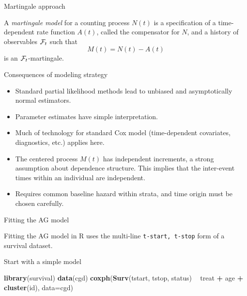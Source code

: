 \documentclass[ignorenonframetext,]{beamer}
\newenvironment{Shaded}{\begin{snugshade}}{\end{snugshade}}
\newcommand{\DataTypeTok}[1]{\textcolor[rgb]{0.13,0.29,0.53}{#1}}
\newcommand{\KeywordTok}[1]{\textcolor[rgb]{0.13,0.29,0.53}{\textbf{#1}}}
\newcommand{\NormalTok}[1]{#1}
\newcommand{\OperatorTok}[1]{\textcolor[rgb]{0.81,0.36,0.00}{\textbf{#1}}}
\newcommand{\StringTok}[1]{\textcolor[rgb]{0.31,0.60,0.02}{#1}}
\begin{document}
\begin{frame}{%
\protect\hypertarget{martingale-approach}{%
Martingale approach}}

A \emph{martingale model} for a counting process \(N(t)\) is a
specification of a time-dependent rate function \(A(t)\), called the
compensator for \(N\), and a history of observables \({\cal F}_t\) such
that \[
    M(t) = N(t) - A(t)
\] is an \({\cal F}_t\)-martingale.

\end{frame}

\begin{frame}{%
\protect\hypertarget{consequences-of-modeling-strategy}{%
Consequences of modeling strategy}}

\begin{itemize}
\item
  Standard partial likelihood methods lead to unbiased and
  asymptotically normal estimators.
\item
  Parameter estimates have simple interpretation.
\item
  Much of technology for standard Cox model (time-dependent covariates,
  diagnostics, etc.) applies here.
\item
  The centered process \(M(t)\) has independent increments, a strong
  assumption about dependence structure. This implies that the
  inter-event times within an individual are independent.
\item
  Requires common baseline hazard within strata, and time origin must be
  chosen carefully.
\end{itemize}

\end{frame}

\begin{frame}[fragile]{%
\protect\hypertarget{fitting-the-ag-model}{%
Fitting the AG model}}

Fitting the AG model in \textsf{R} uses the multi-line
\texttt{t-start, t-stop} form of a survival dataset.

Start with a simple model \footnotesize

\begin{Shaded}
\begin{Highlighting}[]
\KeywordTok{library}\NormalTok{(survival)}
\KeywordTok{data}\NormalTok{(cgd)}
\KeywordTok{coxph}\NormalTok{(}\KeywordTok{Surv}\NormalTok{(tstart, tstop, status) }\OperatorTok{~}\StringTok{ }\NormalTok{treat }\OperatorTok{+}\StringTok{ }\NormalTok{age }
      \OperatorTok{+}\StringTok{ }\KeywordTok{cluster}\NormalTok{(id), }\DataTypeTok{data=}\NormalTok{cgd)}
\end{Highlighting}
\end{Shaded}

\end{frame}
\end{document}
